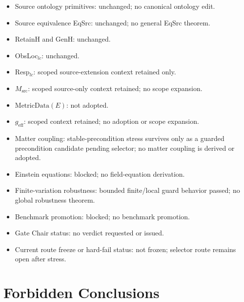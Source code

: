\begin{itemize}
  \item Source ontology primitives: unchanged; no canonical ontology edit.
  \item Source equivalence EqSrc: unchanged; no general EqSrc theorem.
  \item RetainH and GenH: unchanged.
  \item ObsLoc\(_{lc}\): unchanged.
  \item Resp\(_{lc}\): scoped source-extension context retained only.
  \item \(M_{\mathrm{src}}\): scoped source-only context retained; no scope
    expansion.
  \item \(\mathrm{MetricData}(E)\): not adopted.
  \item \(g_{\mathrm{eff}}\): scoped context retained; no adoption or scope
    expansion.
  \item Matter coupling: stable-precondition stress survives only as a
    guarded precondition candidate pending selector; no matter coupling is
    derived or adopted.
  \item Einstein equations: blocked; no field-equation derivation.
  \item Finite-variation robustness: bounded finite/local guard behavior
    passed; no global robustness theorem.
  \item Benchmark promotion: blocked; no benchmark promotion.
  \item Gate Chair status: no verdict requested or issued.
  \item Current route freeze or hard-fail status: not frozen; selector route
    remains open after stress.
\end{itemize}

\section{Forbidden Conclusions}

